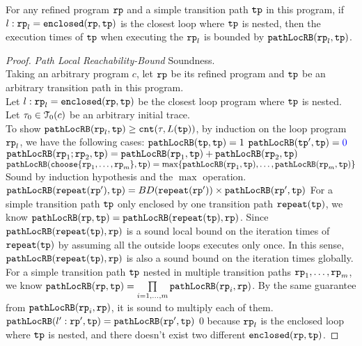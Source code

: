 \begin{lemma}
    For any refined program $\mathtt{rp}$ and a simple transition path $\mathtt{tp}$ in this program,
    if $l: \mathtt{rp}_l = \mathtt{enclosed}(\mathtt{rp}, \mathtt{tp})$ is the closest loop where $\mathtt{tp}$ is nested,
    then the execution times of $\mathtt{tp}$ when executing the $\mathtt{rp}_l$ is bounded by $\mathtt{pathLocRB}(\mathtt{rp}_l, \mathtt{tp})$.
  \end{lemma}
\begin{proof}
\emph{Path Local Reachability-Bound} Soundness.
\\
Taking an arbitrary program $c$, let $\mathtt{rp}$ be its refined program and $\mathtt{tp}$ be an arbitrary transition path in this program.
\\
Let $l: \mathtt{rp}_l = \mathtt{enclosed}(\mathtt{rp}, \mathtt{tp})$ be the closest loop program where $\mathtt{tp}$ is nested.
\\
Let $\mathtt{\tau}_0 \in \mathcal{T}_0(c)$ be an arbitrary initial trace.
\\
To show $\mathtt{pathLocRB}(\mathtt{rp}_l, \mathtt{tp}) \geq \mathtt{cnt}(\mathtt{\tau}, L(\mathtt{tp}))$, by induction on the loop program $\mathtt{rp}_l$,
we have the following cases:
$\mathtt{pathLocRB}(\mathtt{tp}, \mathtt{tp}) = 1$
$\outinB(\tpath', \tpath) = \highlight{0} $
$\mathtt{pathLocRB}(\mathtt{rp}_1;\mathtt{rp}_2, \mathtt{tp}) = \mathtt{pathLocRB}(\mathtt{rp}_1, \mathtt{tp}) + \mathtt{pathLocRB}(\mathtt{rp}_2, \mathtt{tp}) $
$\outinB(\rpchoose{\rprog_1, \ldots, \rprog_m }, \tpath) = \max\left\{ \outinB(\rprog_1, \tpath), \ldots, \outinB(\rprog_m, \tpath) \right\}$ 
Sound by induction hypothesis and the $\max$ operation.
$\mathtt{pathLocRB}(\mathtt{repeat}(\mathtt{rp}'), \mathtt{tp}) = BD(\mathtt{repeat}(\mathtt{rp}')) \times \mathtt{pathLocRB}(\mathtt{rp}', \mathtt{tp})$
For a simple transition path $\mathtt{tp}$ only enclosed by one transition path $\mathtt{repeat}(\mathtt{tp})$, 
we know $\mathtt{pathLocRB}(\mathtt{rp}, \mathtt{tp}) = \mathtt{pathLocRB}(\mathtt{repeat}(\mathtt{tp}), \mathtt{rp})$.
Since $\mathtt{pathLocRB}(\mathtt{repeat}(\mathtt{tp}), \mathtt{rp})$ is a sound local bound on the iteration times
of $\mathtt{repeat}(\mathtt{tp})$ by assuming all the outside loops executes only once.
In this sense, $\mathtt{pathLocRB}(\mathtt{repeat}(\mathtt{tp}), \mathtt{rp})$ is also a sound bound on the iteration times globally.
\\
For a simple transition path $\mathtt{tp}$ nested in multiple transition paths $\mathtt{rp}_1, \ldots, \mathtt{rp}_m$,
we know $\mathtt{pathLocRB}(\mathtt{rp}, \mathtt{tp}) = \prod\limits_{i = 1, \ldots, m}\mathtt{pathLocRB}(\mathtt{rp}_i, \mathtt{rp})$.
By the same guarantee from $\mathtt{pathLocRB}(\mathtt{rp}_i, \mathtt{rp})$, it is sound to multiply each of them.
$\mathtt{pathLocRB}(l': \mathtt{rp}', \mathtt{tp}) = \mathtt{pathLocRB}(\mathtt{rp}', \mathtt{tp})$ 
 0 because $\mathtt{rp}_l$ is the enclosed loop where $\mathtt{tp}$ is nested, and there doesn't exist two different $\mathtt{enclosed}(\mathtt{rp}, \mathtt{tp})$.

\end{proof}